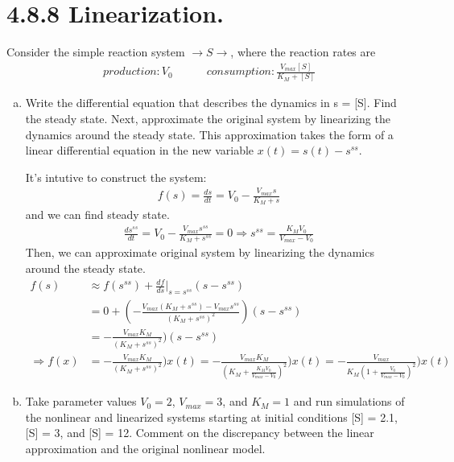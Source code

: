 \documentclass[paper=a4, fontsize=11pt]{scrartcl} %
\numberwithin{equation}{section} %
\numberwithin{figure}{section} %
\numberwithin{table}{section} %
\begin{document}
\section{4.8.8 Linearization.}
	Consider the simple reaction system $\rightarrow S \rightarrow$, where the reaction rates are
	\begin{gather*}
			production: V_0 \quad \quad \quad consumption: \frac{V_{max}[S]}{K_M+[S]}
	\end{gather*} 
	\begin{enumerate}[a)]
		\item Write the differential equation that describes the dynamics in s = [S]. Find the steady state. Next, approximate the original system by linearizing the dynamics around the steady state. This approximation takes the form of a linear differential equation in the new variable $x(t) = s(t)-s^{ss}$.

		It's intutive to construct the system:
		\begin{align*}
			f(s)=\frac{ds}{dt}=V_0-\frac{V_{max}s}{K_M+s}
		\end{align*}
		and we can find steady state.
		\begin{gather*}
			\frac{ds^{ss}}{dt}=V_0- \frac{V_{max}s^{ss}}{K_M+s^{ss}}=0 \Rightarrow s^{ss}=\frac{K_MV_0}{V_{max}-V_0}
		\end{gather*}
		Then, we can approximate original system by linearizing the dynamics around the steady state.
		\begin{align*}
			f(s)&\approx f(s^{ss})+\frac{df}{ds}|_{s=s^{ss}}(s-s^{ss})  \\
				&=0+(-\frac{V_{max}(K_M+s^{ss})-V_{max}s^{ss}}{(K_M+s^{ss})^2})(s-s^{ss}) \\
				&=-\frac{V_{max}K_M}{(K_M+s^{ss})^2})(s-s^{ss})\\
			\Rightarrow f(x)&=-\frac{V_{max}K_M}{(K_M+s^{ss})^2})x(t)=-\frac{V_{max}K_M}{(K_M+\frac{K_MV_0}{V_{max}-V_0})^2})x(t)=-\frac{V_{max}}{K_M(1+\frac{V_0}{V_{max}-V_0})^2})x(t)
		\end{align*}
		\item Take parameter values $V_0 = 2$, $V_{max} = 3$, and $K_M = 1$ and run simulations of the nonlinear and linearized systems starting at initial conditions [S] = 2.1, [S] = 3, and [S] = 12. Comment on the discrepancy between the linear approximation and the original nonlinear model.
	\end{enumerate}
\end{document}
